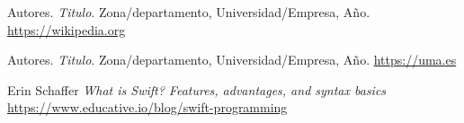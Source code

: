 
\begin{thebibliography}{9}
    Autores.
    \textit{Titulo}. Zona/departamento, Universidad/Empresa, Año.
    \url{https://wikipedia.org}

    Autores.
    \textit{Titulo}. Zona/departamento, Universidad/Empresa, Año.
    \url{https://uma.es}

    Erin Schaffer
    \textit{What is Swift? Features, advantages, and syntax basics}
    \url{https://www.educative.io/blog/swift-programming}


\end{thebibliography}